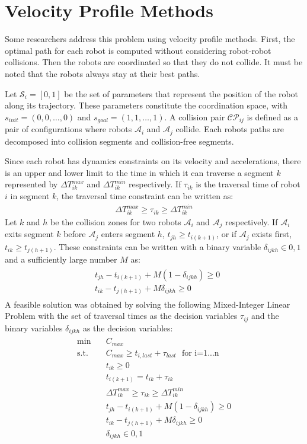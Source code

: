 \section{Velocity Profile Methods}
Some researchers address this problem using velocity profile methods\cite{peng2005coordinating}. First, the optimal path for each robot is computed without considering robot-robot collisions. Then the robots are coordinated so that they do not collide. It must be noted that the robots always stay at their best paths. 

Let $\mathcal{S}_i=[0,1]$  be the set of parameters that represent the position of the robot along its trajectory. These parameters constitute the coordination space, with $s_{init}=(0,0,\ldots,0)$ and $s_{goal}=(1,1,\ldots,1)$. A collision pair $\mathcal{CP}_{ij}$ is defined as a pair of configurations where robots $\mathcal{A}_i$ and $\mathcal{A}_j$ collide. Each robots paths are decomposed into collision segments and collision-free segments. 

Since each robot has dynamics constraints on its velocity and accelerations, there is an upper and lower limit to the time in which it can traverse a segment $k$ represented by $\Delta T_{ik}^{max}$ and $\Delta T_{ik}^{min}$ respectively. If $\tau_{ik}$ is the traversal time of robot $i$ in segment $k$, the traversal time constraint can be written as:
\begin{align}
\Delta T_{ik}^{max}\geq \tau_{ik} \geq \Delta T_{ik}^{min}
\end{align}
Let $k$ and $h$ be the collision zones for two robots $\mathcal{A}_i$ and $\mathcal{A}_j$ respectively. If $\mathcal{A}_i$ exits segment $k$ before $\mathcal{A}_j$ enters segment $h$, $t_{jh}\geq t_{i(k+1)}$, or if $\mathcal{A}_j$ exists first, $t_{ik}\geq t_{j(h+1)}$. These constraints can be written with a binary variable $\delta_{ijkh}\in {0,1}$ and a sufficiently large number $M$ as:
\begin{align}
\begin{split}
&t_{jh}-t_{i(k+1)} + M(1-\delta_{ijkh})\geq 0\\
&t_{ik}-t_{j(h+1)}+M\delta_{ijkh} \geq 0
\end{split}
\end{align}
A feasible solution was obtained by solving the following Mixed-Integer Linear Problem with the set of traversal times as the decision variables $\tau_{ij}$ and the binary variables $\delta_{ijkh}$ as the decision variables:
\begin{align}
\begin{split}
\min \quad &C_{max}\\
\text{s.t.} \quad &C_{max}\geq t_{i,last} + \tau_{last}~~~\text{for i=1...n}\\
&t_{ik}\geq 0\\
&t_{i(k+1)}=t_{ik}+\tau_{ik}\\
&\Delta T_{ik}^{max}\geq \tau_{ik} \geq \Delta T_{ik}^{min}\\
&t_{jh}-t_{i(k+1)} + M(1-\delta_{ijkh})\geq 0\\
&t_{ik}-t_{j(h+1)}+M\delta_{ijkh} \geq 0\\
&\delta_{ijkh}\in {0,1}
\end{split}
\end{align}

